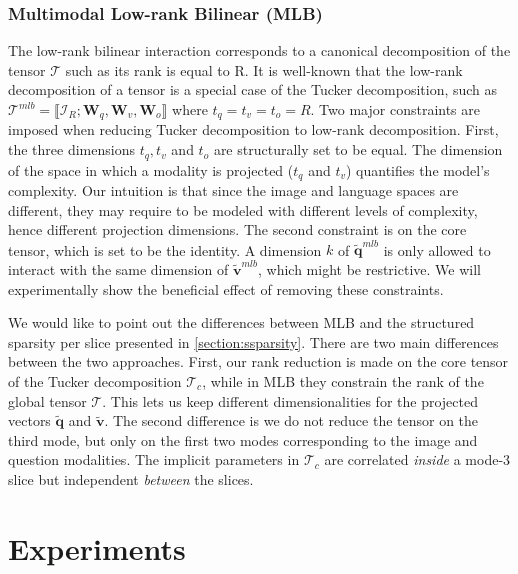 \documentclass[10pt,twocolumn,letterpaper]{article}
\newcommand{\tens}[1]{
\bm{\mathcal{#1}}
}
\newcommand{\mat}[1]{\bm{#1}}
\newcommand{\tq}{\mathbf{\tilde{q}}}
\newcommand{\tv}{\mathbf{\tilde{v}}}
\begin{document}
\subsubsection{Multimodal Low-rank Bilinear (MLB)}

The low-rank bilinear interaction corresponds to a canonical decomposition of the tensor $\tens{T}$ such as its rank is equal to R. It is well-known that the low-rank decomposition of a tensor is a special case of the Tucker decomposition, such as $\tens{T}^{mlb} = \llbracket \tens{I}_R; \mat{W}_q, \mat{W}_v, \mat{W}_o \rrbracket$
where $t_q = t_v = t_o = R$. Two major constraints are imposed when reducing Tucker decomposition to low-rank decomposition. First, the three dimensions $t_q, t_v$ and $t_o$ are structurally set to be equal. The dimension of the space in which a modality is projected ($t_q$ and $t_v$) quantifies the model's complexity. Our intuition is that since the image and language spaces are different, they may require to be modeled with different levels of complexity, hence different projection dimensions. The second constraint is on the core tensor, which is set to be the identity. A dimension $k$ of $\tq^{mlb}$ is only allowed to interact with the same dimension of $\tv^{mlb}$, which might be restrictive. We will experimentally show the beneficial effect of removing these constraints.

We would like to point out the differences between MLB and the structured sparsity per slice presented in \ref{section:ssparsity}. There are two main differences between the two approaches. First, our rank reduction is made on the core tensor of the Tucker decomposition $\tens{T}_c$, while in MLB they constrain the rank of the global tensor $\tens{T}$. This lets us keep different dimensionalities for the projected vectors $\tq$ and $\tv$. The second difference is we do not reduce the tensor on the third mode, but only on the first two modes corresponding to the image and question modalities. The implicit parameters in $\tens{T}_c$ are correlated \emph{inside} a mode-3 slice but independent \emph{between} the slices.
 
\section{Experiments}
\label{sec:expes}
\end{document}
